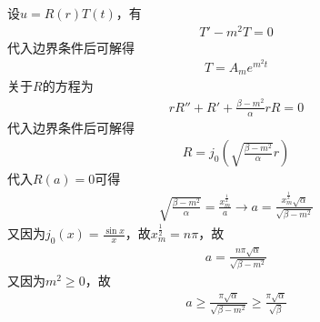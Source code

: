 \documentclass{phyasgn}
\begin{document}
\begin{sol}[1]
设$u=R(r)T(t)$，有
\begin{align*}
    T'-m^2T=0
\end{align*}
代入边界条件后可解得
\begin{align*}
    T=A_me^{m^2 t}
\end{align*}
关于$R$的方程为
\begin{align*}
    rR''+R'+\frac{\beta-m^2}{\alpha}rR=0
\end{align*}
代入边界条件后可解得
\begin{align*}
    R=j_0(\sqrt{\frac{\beta-m^2}{\alpha}}r)
\end{align*}
代入$R(a)=0$可得
\begin{align*}
    \sqrt{\frac{\beta-m^2}{\alpha}}=\frac{x_m^{\frac{1}{2}}}{a}\to a=\frac{x_m^{\frac{1}{2}}\sqrt{\alpha}}{\sqrt{\beta-m^2}}
\end{align*}
又因为$j_0(x)=\frac{\sin x}{x}$，故$x_m^{\frac{1}{2}}=n\pi$，故
\begin{align*}
    a=\frac{n\pi\sqrt{\alpha}}{\sqrt{\beta-m^2}}
\end{align*}
又因为$m^2\ge 0$，故
\begin{align*}
    a\ge \frac{\pi\sqrt{\alpha}}{\sqrt{\beta-m^2}}\ge\frac{\pi\sqrt{\alpha}}{\sqrt{\beta}}
\end{align*}
\end{sol}\par
\end{document}

